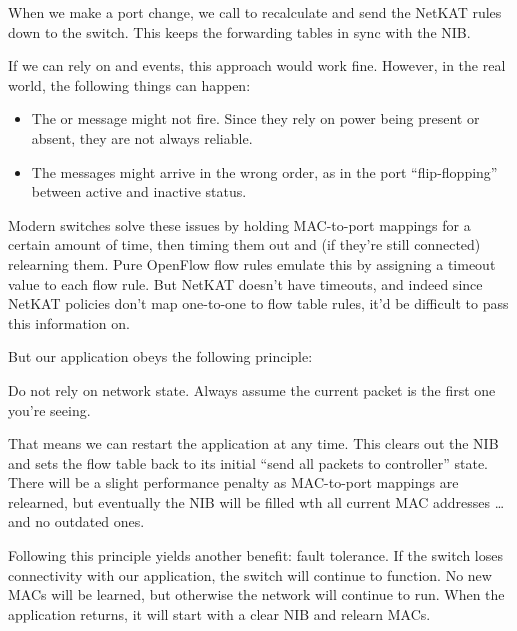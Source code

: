 \inputminted[firstline=60,lastline=69]{python}{code/l2_learning_switch/learning4.py}

When we make a port change, we call  to recalculate and send the NetKAT rules down to the 
switch.  This keeps the forwarding tables in sync with the NIB.  

If we can rely on  and  events, this approach would work fine.
However, in the real world, the following things can happen:

\begin{itemize}
\item The  or  message might not fire.  Since they rely on power being
present or absent, they are not always reliable.
\item The messages might arrive in the wrong order, as in the port ``flip-flopping'' between active and 
inactive status.
\end{itemize}

Modern switches solve these issues by holding MAC-to-port mappings for a certain amount of time, then 
timing them out and (if they're still connected) relearning them.  Pure OpenFlow flow rules emulate
this by assigning a timeout value to each flow rule.   But NetKAT doesn't have timeouts, and indeed since
NetKAT policies don't map one-to-one to flow table rules, it'd be difficult to pass this information on.

But our application obeys the following principle:

\setcounter{principle}{4}

\begin{principle}
Do not rely on network state.  Always assume the current packet is the first one you're seeing.   
\end{principle}
 
That means we can restart the application at any time.  This clears out the NIB and sets the flow table
back to its initial ``send all packets to controller'' state.  
There will be a slight performance penalty as MAC-to-port mappings are relearned, but eventually the
NIB will be filled wth all current MAC addresses \ldots and no outdated ones.

Following this principle yields another benefit: fault tolerance.  If the switch loses connectivity with 
our application, the switch will continue to function.  No new MACs will be learned, but otherwise the 
network will continue to run.  When the application returns, it will start with a clear NIB and relearn MACs.  

